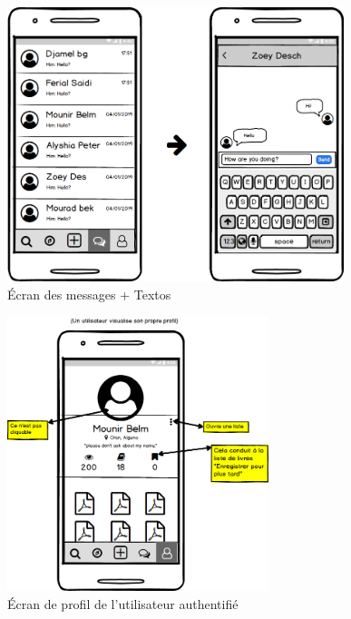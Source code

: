 \begin{figure}[H]
	\begin{center}
		\includegraphics[height=8cm]{Images/chapter3/wireframe/messages.png}
		\caption{{\footnotesize Écran des messages + Textos}}
	\end{center}
\end{figure}

\begin{figure}[H]
	\begin{center}
		\includegraphics[height=8cm]{Images/chapter3/wireframe/profile.png}
		\caption{{\footnotesize Écran de profil de l'utilisateur authentifié}}
	\end{center}
\end{figure}

